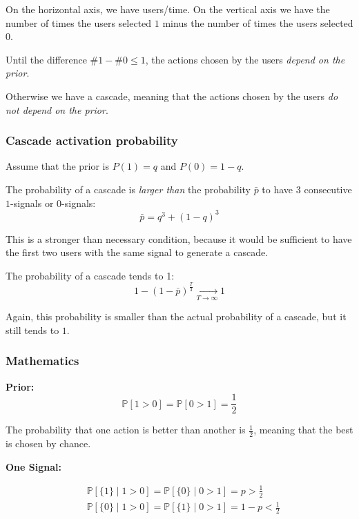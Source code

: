 \documentclass[10pt,a4paper]{article}
\begin{document}
On the horizontal axis, we have users/time. On the vertical axis we have the number of times the users selected $1$ minus the number of times the users selected $0$.

\begin{shaded}
Until the difference $\#1 - \#0 \le 1$, the actions chosen by the users \textit{depend on the prior}.

Otherwise we have a cascade, meaning that the actions chosen by the users \textit{do not depend on the prior}.
\end{shaded}

\subsubsection{Cascade activation probability}\label{cascade-activation-probability}

Assume that the prior is $P(1)=q$ and $P(0)=1-q$.

The probability of a cascade is \textit{larger than} the probability $\bar{p}$ to have $3$ consecutive $1$-signals or $0$-signals:
$$\bar{p} = q^3 + (1 - q)^3$$

This is a stronger than necessary condition, because it would be sufficient to have the first two users with the same signal to generate a cascade.

The probability of a cascade tends to 1:
$$1-(1-\bar{p})^{\frac{T}{3}} \xrightarrow[T\rightarrow \infty]{} 1$$

Again, this probability is smaller than the actual probability of a cascade, but it still tends to $1$.

\subsubsection{Mathematics}\label{mathematics}

\textbf{Prior:}
$$\mathbb{P}[1>0] =\mathbb{P}[0>1]=\frac{1}{2}$$

The probability that one action is better than another is $\frac{1}{2}$, meaning that the best is chosen by chance.

\textbf{One Signal:}

$$\begin{aligned}
&\mathbb{P}[\{1\} \mid 1>0] =\mathbb{P}[\{0\} \mid 0>1]=p>\frac{1}{2} \\
&\mathbb{P}[\{0\} \mid 1>0] =\mathbb{P}[\{1\} \mid 0>1]=1-p<\frac{1}{2} \\
\end{aligned}$$
\end{document}
